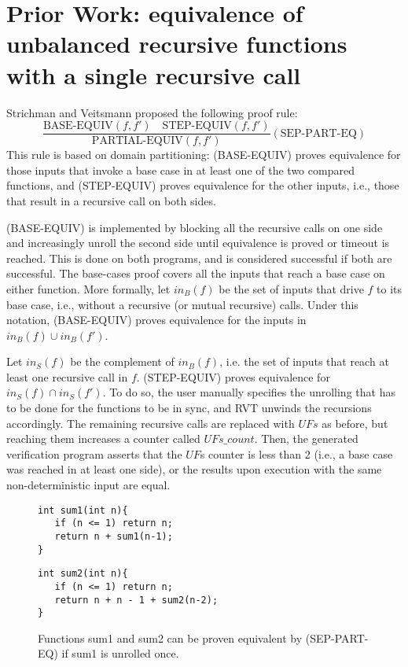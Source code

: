 \section{Prior Work: equivalence of unbalanced recursive functions with a single recursive call}
\label{sec:prev}
Strichman and Veitsmann \cite{DBLP:conf/fm/StrichmanV16} proposed the following  proof rule:
\begin{equation}\label{eq:sep-part-eq}
 {\frac {\text{BASE-EQUIV}(f,f') \quad\text{STEP-EQUIV}(f,f')}{\text{PARTIAL-EQUIV}(f,f')}} 
  (\text{SEP-PART-EQ})
\end{equation}
This rule is based on domain partitioning: (BASE-EQUIV) proves equivalence for those inputs that invoke a base case in at least one of the two compared functions, and (STEP-EQUIV) proves equivalence for the other inputs, i.e., those that result in a recursive call on both sides.

(BASE-EQUIV) is implemented by blocking all the recursive calls on one side and increasingly unroll the second side until equivalence is proved or timeout is reached. This is done on both programs, and is considered successful if both are successful. The base-cases proof covers all the inputs that reach a base case on either function. More formally, let $in_B(f)$ be the set of inputs that drive $f$ to its base case, i.e., without a recursive (or mutual recursive) calls. Under this notation, (BASE-EQUIV) proves equivalence for the  inputs in $in_B(f) \cup in_B(f')$.

Let $in_S(f)$ be the complement of $in_B(f)$, i.e. the set of inputs that reach at least one recursive call in $f$. (STEP-EQUIV) proves equivalence for $in_S(f) \cap in_S(f')$. To do so, the user manually specifies the unrolling that has to be done for the functions to be in sync, and RVT unwinds the recursions accordingly. The remaining recursive calls are replaced with $UFs$ as before, but reaching them increases a counter called $UFs\_count$. Then, the generated verification program asserts that the $UF$s counter is less than 2  (i.e., a base case was reached in at least one side), or the results upon execution with the same non-deterministic input are equal. 

\begin{figure}[h]
\begin{center}
\begin{minipage}{7 cm}
\begin{lstlisting}
int sum1(int n){
   if (n <= 1) return n;
   return n + sum1(n-1);
}
\end{lstlisting}
\end{minipage}
\begin{minipage}{7 cm}
\begin{lstlisting}
int sum2(int n){
   if (n <= 1) return n;
   return n + n - 1 + sum2(n-2);
}
\end{lstlisting}
\end{minipage}
\caption{Functions sum1 and sum2 can be proven equivalent by (SEP-PART-EQ) if sum1 is unrolled once.}
\label{fig:sum}
\end{center}
\end{figure}

